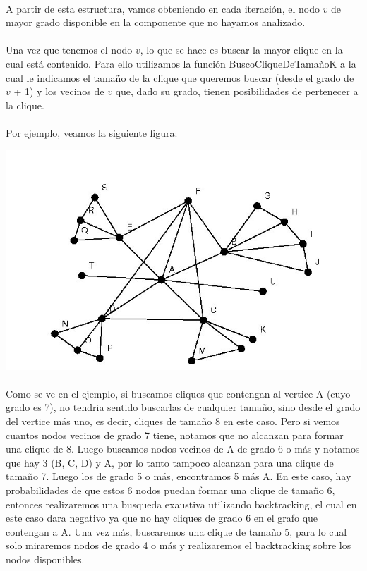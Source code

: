 \paragraph{}
A partir de esta estructura, vamos obteniendo en cada iteración, el nodo $v$ de mayor grado disponible en la componente que no hayamos analizado.

\paragraph{}
Una vez que tenemos el nodo $v$, lo que se hace es buscar la mayor clique en la cual está contenido. Para ello utilizamos la función BuscoCliqueDeTamañoK a la cual le indicamos el tamaño de la clique que queremos buscar (desde el grado de $v$ + 1) y los vecinos de $v$ que, dado su grado, tienen posibilidades de pertenecer a la clique.

\paragraph{}
Por ejemplo, veamos la siguiente figura:

\includegraphics[scale = 0.9]{./otros/p.jpg} \\

\paragraph{}
Como se ve en el ejemplo, si buscamos cliques que contengan al vertice A (cuyo grado es 7), no tendria sentido buscarlas de cualquier tamaño, sino desde el grado del vertice más uno, es decir, cliques de tamaño 8 en este caso. Pero si vemos cuantos nodos vecinos de grado 7 tiene, notamos que no alcanzan para formar una clique de 8. Luego buscamos nodos vecinos de A de grado 6 o más y notamos que hay 3 (B, C, D) y A, por lo tanto tampoco alcanzan para una clique de tamaño 7. Luego los de grado 5 o más, encontramos 5 más A. En este caso, hay probabilidades de que estos 6 nodos puedan formar una clique de tamaño 6, entonces realizaremos una busqueda exaustiva utilizando backtracking, el cual en este caso dara negativo ya que no hay cliques de grado 6 en el grafo que contengan a A. Una vez más, buscaremos una clique de tamaño 5, para lo cual solo miraremos nodos de grado 4 o más y realizaremos el backtracking sobre los nodos disponibles. 

